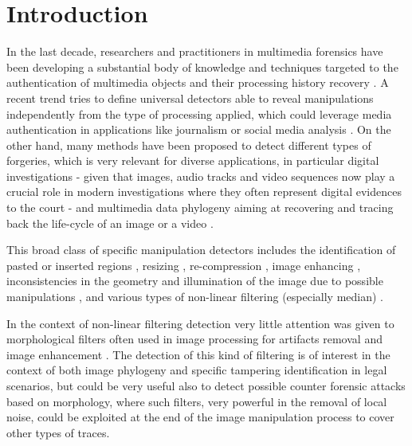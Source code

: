 \documentclass{ieeeaccess}
\begin{document}
\titlepgskip=-15pt

\maketitle

\section{Introduction}
\label{sec:intro}

In the last decade, researchers and practitioners in multimedia forensics have been developing a substantial body of knowledge and techniques targeted to the authentication of multimedia objects and their processing history recovery \cite{stamm_overview, farid_book, ho, piva_overview, sencar_book}. 
A recent trend tries to define universal detectors able to reveal manipulations independently from the type of processing applied, which could leverage media authentication in applications like journalism or social media analysis \cite{noiseprint}. 
On the other hand, many methods have been proposed to detect different types of forgeries, which is very relevant for diverse applications, in particular digital investigations - given that images, audio tracks and video sequences now play a crucial role in modern investigations where they often represent digital evidences to the court \cite{forlab} - and multimedia data phylogeny aiming at recovering and tracing back the life-cycle of an image or a video \cite{Bestagini2016, Dias2012, Oliveira2016, Costa2014}.

This broad class of specific manipulation detectors includes the identification of pasted or inserted regions \cite{cm2, cm3, cm4, spl2, spl3}, resizing \cite{fernando2017, PB-TIFS-2019}, re-compression \cite{PBPG2017-TIFS},  image enhancing \cite{shan2019robust}, inconsistencies in the geometry and illumination of the image due to possible manipulations \cite{geom1, geom2, phys1}, and various types of non-linear filtering (especially median) \cite{Bahrami2015, Cao2014, Cao2011, Fridrich2010, Tian2010, Yuan:2011, Liu2013, Huang2013, Shi2014, Wang2015, Pasquini2016-TIFS, gao2019robust}. 

In the context of non-linear filtering detection 
very little attention was given to morphological filters \cite{haas1967morphologie} often used in image processing for artifacts removal and image enhancement \cite{British2012} \cite{Maragos2004}. The detection of this kind of filtering is of interest in the context of both image phylogeny and specific tampering identification in legal scenarios, but could be very useful also to detect possible counter forensic attacks based on morphology, where such filters, very powerful in the removal of local noise, could be exploited at the end of the image manipulation process to cover other types of traces. 
\end{document}
